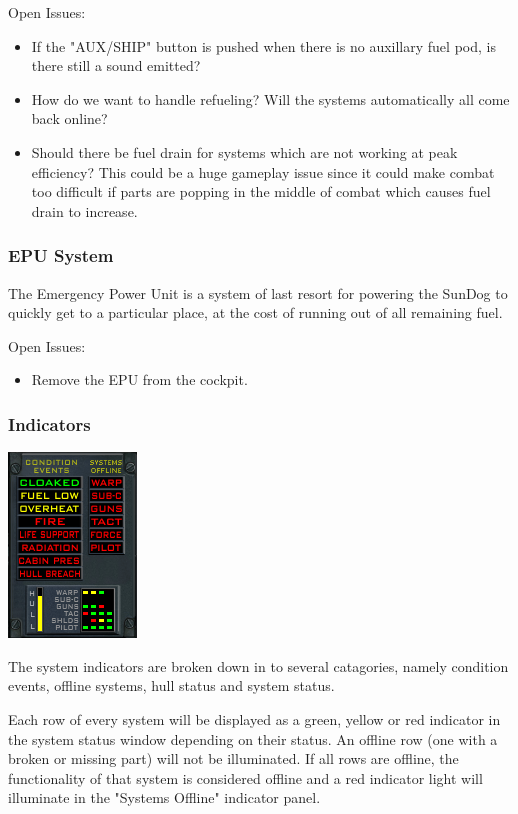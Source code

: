 Open Issues:
\begin{itemize}
\item If the "AUX\slash SHIP" button is pushed when there is no auxillary
fuel pod, is there still a sound emitted?
\item How do we want to handle refueling?  Will the systems automatically
all come back online?
\item Should there be fuel drain for systems which are not working at
peak efficiency?  This could be a huge gameplay issue since it could make
combat too difficult if parts are popping in the middle of combat which
causes fuel drain to increase.
\end{itemize}

\subsubsection{EPU System}

The Emergency Power Unit is a system of last resort for powering the
SunDog to quickly get to a particular place, at the cost of running
out of all remaining fuel.

Open Issues:
\begin{itemize}
\item Remove the EPU from the cockpit.
\end{itemize}

\subsubsection{Indicators}
\includegraphics[scale=0.70]{images/indicators.png}

The system indicators are broken down in to several catagories, namely
condition events, offline systems, hull status and system status.

Each row of every system will be displayed as a green, yellow or red
indicator in the system status window depending on their status.  An
offline row (one with a broken or missing part) will not be illuminated.
If all rows are offline, the functionality of that system is considered
offline and a red indicator light will illuminate in the "Systems Offline"
indicator panel.


